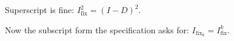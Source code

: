 \documentclass[11pt]{article}
\newcommand{\Ifix}{I_{\mathrm{fix}}}
\begin{document}
Superscript is fine: $\Ifix^2 = (I-D)^2$.

Now the subscript form the specification asks for: $\Ifix_k = \Ifix^k$.
\end{document}
